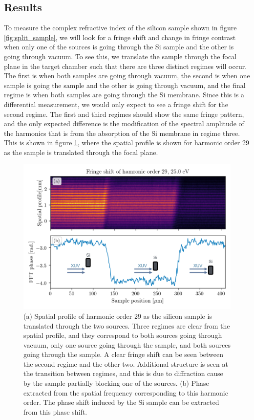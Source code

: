 \subsection{Results}
To measure the complex refractive index of the silicon sample shown in figure \ref{fig:split_sample}, we will look for a fringe shift and change in fringe contrast when only one of the sources is going through the Si sample and the other is going through vacuum.  To see this, we translate the sample through the focal plane in the target chamber such that there are three distinct regimes will occur.  The first is when both samples are going through vacuum, the second is when one sample is going the sample and the other is going through vacuum, and the final regime is when both samples are going through the Si membrane.  Since this is a differential measurement, we would only expect to see a fringe shift for the second regime.  The first and third regimes should show the same fringe pattern, and the only expected difference is the modification of the spectral amplitude of the harmonics that is from the absorption of the Si membrane in regime three.  This is shown in figure \ref{fig:harmonic_phase_shift}, where the spatial profile is shown for harmonic order 29 as the sample is translated through the focal plane.  
\begin{figure}
	\centering
	\includegraphics[width=1.0\textwidth]{figures/refractive_index/harmonic_phase_shift.png}
	\caption{(a) Spatial profile of harmonic order 29 as the silicon sample is translated through the two sources. Three regimes are clear from the spatial profile, and they correspond to both sources going through vacuum, only one source going through the sample, and both sources going through the sample.  A clear fringe shift can be seen between the second regime and the other two.  Additional structure is seen at the transition between regimes, and this is due to diffraction cause by the sample partially blocking one of the sources. (b) Phase extracted from the spatial frequency corresponding to this harmonic order.  The phase shift induced by the Si sample can be extracted from this phase shift.}
	\label{fig:harmonic_phase_shift}
\end{figure}
